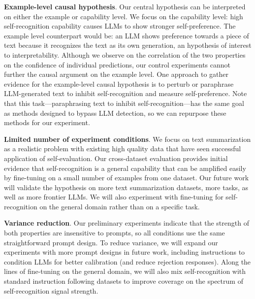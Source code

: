 \documentclass{article}
\theoremstyle{plain}
\theoremstyle{definition}
\theoremstyle{remark}
\begin{document}
\noindent\textbf{Example-level causal hypothesis}.
Our central hypothesis can be interpreted on either the example or capability level.
We focus on the capability level: high self-recognition capability causes LLMs to show stronger self-preference.
The example level counterpart would be: an LLM shows preference towards a piece of text because it recognizes the text as its own generation, an hypothesis of interest to interpretability.
Although we observe on the correlation of the two properties on the confidence of individual predictions, our control experiments cannot further the causal argument on the example level.
One approach to gather evidence for the example-level causal hypothesis is to perturb or paraphrase LLM-generated text to inhibit self-recognition and measure self-preference.
Note that this task---paraphrasing text to inhibit self-recognition---has the same goal as methods designed to bypass LLM detection, so we can repurpose these methods for our experiment.

\noindent\textbf{Limited number of experiment conditions}.
We focus on text summarization as a realistic problem with existing high quality data that have seen successful application of self-evaluation.
Our cross-dataset evaluation provides initial evidence that self-recognition is a general capability that can be amplified easily by fine-tuning on a small number of examples from one dataset.
Our future work will validate the hypothesis on more text summarization datasets, more tasks, as well as more frontier LLMs.
We will also experiment with fine-tuning for self-recognition on the general domain rather than on a specific task.

\noindent\textbf{Variance reduction}.
Our preliminary experiments indicate that the strength of both properties are insensitive to prompts, so all conditions use the same straightforward prompt design.
To reduce variance, we will expand our experiments with more prompt designs in future work, including instructions to condition LLMs for better calibration (and reduce rejection responses).
Along the lines of fine-tuning on the general domain, we will also mix self-recognition with standard instruction following datasets to improve coverage on the spectrum of self-recognition signal strength.

\end{document}
